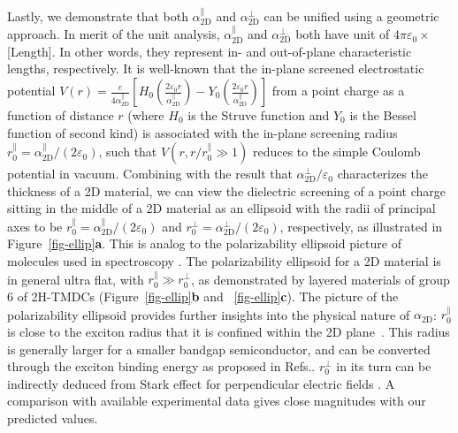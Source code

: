 \documentclass[journal=ancac3,manuscript=article,email=true,hyperref=true,keywords=false]{achemso}
\begin{document}
%
Lastly, we demonstrate that both $\alpha_{\mathrm{2D}}^{\parallel}$
and $\alpha_{\mathrm{2D}}^{\perp}$ can be unified using a geometric
approach. In merit of the unit analysis,
$\alpha_{\mathrm{2D}}^{\parallel}$ and $\alpha_{\mathrm{2D}}^{\perp}$
both have unit of $4\pi\varepsilon_{0} \times$[Length]. In other words,
they represent in- and out-of-plane characteristic lengths,
respectively. 
%
It is well-known that the in-plane screened
electrostatic potential 
$V(r) = {\displaystyle \frac{e}{4 \alpha_{\mathrm{2D}}^{\parallel}}}
\left[H_{0}({\displaystyle \frac{2\varepsilon_{0}
      r}{\alpha_{\mathrm{2D}}^{\parallel}}}) - Y_{0}( {\displaystyle
    \frac{2
      \varepsilon_{0}r}{\alpha_{\mathrm{2D}}^{\parallel}}})\right]$
from a point charge as a function of distance $r$\cite{Keldysh_1979_eps_multi,Pulci_2014} 
(where $H_{0}$ is the Struve
function and $Y_{0}$ is the Bessel function of second kind) 
is associated with the in-plane screening radius
$r_{0}^{\parallel}=\alpha_{\mathrm{2D}}^{\parallel}/(2
\varepsilon_{0})$, such that $V(r,r/r^{\parallel}_{0} \gg 1)$ reduces
to the simple Coulomb potential in vacuum. Combining with the result
that $\alpha_{\mathrm{2D}}^{\perp}/\varepsilon_{0}$ characterizes the
thickness of a 2D material, we can view the dielectric screening of a
point charge sitting in the middle of a 2D material as an ellipsoid
with the radii of principal axes to be
$r_{0}^{\parallel} = \alpha_{\mathrm{2D}}^{\parallel}/(2
\varepsilon_{0})$ and
$r_{0}^{\perp} = \alpha^{\perp}_{\mathrm{2D}}/(2 \varepsilon_{0})$,
respectively, as illustrated in Figure~\ref{fig-ellip}\textbf{a}.
This is analog to the polarizability ellipsoid picture of molecules
used in spectroscopy \cite{Banwell_1994}. The polarizability ellipsoid
for a 2D material is in general ultra flat, with
$r_{0}^{\parallel} \gg r_{0}^{\perp}$, as demonstrated by layered materials 
of group 6 of 2H-TMDCs (Figure~\ref{fig-ellip}\textbf{b} and
~\ref{fig-ellip}\textbf{c}). 
%
The picture of the polarizability ellipsoid
provides further insights into the physical nature of
$\alpha_{\mathrm{2D}}$: $r_{0}^{\parallel}$ is close to the exciton
radius that it is confined within the 2D plane~\cite{Pulci_2014}. This radius is
generally larger for a smaller bandgap semiconductor, and can be
converted through the exciton binding energy as proposed in
Refs.\cite{Olsen_2016_hydrogen,Jiang_2017_Eg_Eb}.
%
$r_{0}^{\perp}$ in its turn can be 
indirectly deduced from Stark effect for perpendicular electric fields 
\cite{Pedersen_2016,Klein_2016,Roch_2018}. A comparison with 
available experimental data\cite{Verzhbitskiy19, Roch_2018} gives 
close magnitudes with our predicted values. 
\end{document}
